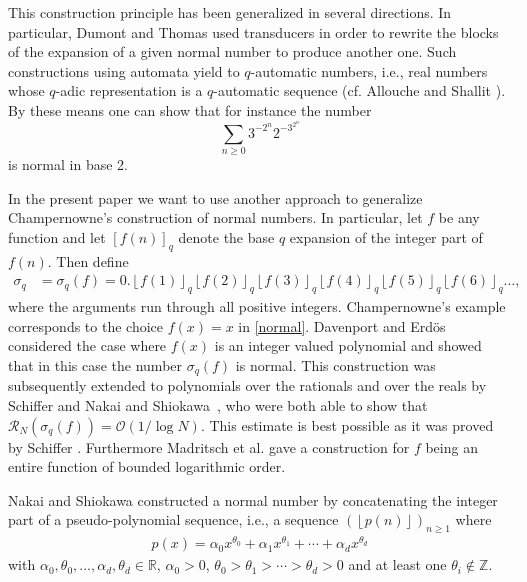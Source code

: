 \documentclass[a4paper,10pt]{amsart}
\numberwithin{equation}{section}
\theoremstyle{definition}
\theoremstyle{remark}
\newcommand{\Z}{\mathbb{Z}}
\newcommand{\R}{\mathbb{R}}
\newcommand{\lf}{\left\lfloor}
\newcommand{\rf}{\right\rfloor}
\begin{document}
This construction principle has been generalized in several directions. In
particular, Dumont and Thomas \cite{Dumont_Thomas1994:modifications_de_nombres}
used transducers in order to rewrite the blocks of the expansion of a given normal
number to produce another one. Such constructions using automata yield to
$q$-automatic numbers, i.e., real numbers whose $q$-adic representation
is a $q$-automatic sequence (cf. Allouche and Shallit
\cite{allouche_shallit2003:automatic_sequences}). By these means one can show
that for instance the number
\[
\sum_{n\geq0}3^{-2^n}2^{-3^{2^n}}
\]
is normal in base 2. 

In the present paper we want to use another approach to generalize
Champernowne's construction of normal numbers. In particular, let $f$ be any
function and let $[f(n)]_q$ denote the base $q$ expansion of the integer part of
$f(n)$. Then define 
\begin{equation}\label{normal}
\begin{split}
\sigma_q&=\sigma_q(f)=
  0.\lf f(1)\rf_q\lf f(2)\rf_q\lf f(3)\rf_q \lf f(4)\rf_q \lf f(5)\rf_q \lf f(6)\rf_q \dots,
\end{split}
\end{equation}
where the arguments run through all positive integers. Champernowne's example
corresponds to the choice $f(x)=x$ in \eqref{normal}. Davenport and Erd{\"o}s 
\cite{davenport_erdoes1952:note_on_normal} considered the case where $f(x)$ is
an integer valued polynomial and showed that in this case the number
$\sigma_q(f)$ is normal. This construction was subsequently extended to
polynomials over the rationals and over the reals by Schiffer
\cite{schiffer1986:discrepancy_normal_numbers} and Nakai and 
Shiokawa~\cite{Nakai_Shiokawa1992:discrepancy_estimates_class}, who were both
able to show that $\mathcal{R}_N(\sigma_q(f))=\mathcal{O}(1/\log N)$. This
estimate is best possible as it was proved by Schiffer 
\cite{schiffer1986:discrepancy_normal_numbers}. Furthermore Madritsch et al.
\cite{Madritsch_Thuswaldner_Tichy2008:normality_numbers_generated} gave a
construction for $f$ being an entire function of bounded logarithmic order.

Nakai and Shiokawa \cite{Nakai_Shiokawa1990:class_normal_numbers} constructed
a normal number by concatenating the integer part of a pseudo-polynomial
sequence, i.e., a sequence $(\lf p(n)\rf)_{n\geq1}$ where
\begin{gather}\label{mani:pseudopoly}
  p(x)=\alpha_0 x^{\theta_0}+\alpha_1x^{\theta_1}+\cdots+\alpha_dx^{\theta_d}
\end{gather}
with $\alpha_0,\theta_0,\ldots,\alpha_d,\theta_d\in\R$, $\alpha_0>0$,
$\theta_0>\theta_1>\cdots>\theta_d>0$ and at least one
$\theta_i\not\in\Z$.
\end{document}
